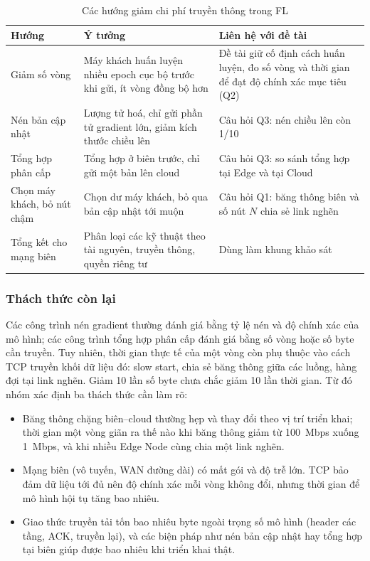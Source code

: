 \begin{table}[H]
    \centering
    \caption{Các hướng giảm chi phí truyền thông trong FL}
    \label{tab:survey}
    \begin{tabularx}{\textwidth}{>{\raggedright\arraybackslash\hsize=0.7\hsize}X >{\raggedright\arraybackslash\hsize=1.3\hsize}X >{\raggedright\arraybackslash\hsize=1.0\hsize}X}
        \toprule
        \textbf{Hướng} & \textbf{Ý tưởng} & \textbf{Liên hệ với đề tài} \\
        \midrule
        Giảm số vòng \cite{mcmahan2017fedavg} & Máy khách huấn luyện nhiều epoch cục bộ trước khi gửi, ít vòng đồng bộ hơn & Đề tài giữ cố định cách huấn luyện, đo số vòng và thời gian để đạt độ chính xác mục tiêu (Q2) \\
        \midrule
        Nén bản cập nhật \cite{konecny2016communication, lin2018dgc} & Lượng tử hoá, chỉ gửi phần tử gradient lớn, giảm kích thước chiều lên & Câu hỏi Q3: nén chiều lên còn 1/10 \\
        \midrule
        Tổng hợp phân cấp \cite{liu2020hierfavg} & Tổng hợp ở biên trước, chỉ gửi một bản lên cloud & Câu hỏi Q3: so sánh tổng hợp tại Edge và tại Cloud \\
        \midrule
        Chọn máy khách, bỏ nút chậm \cite{bonawitz2019towards} & Chọn dư máy khách, bỏ qua bản cập nhật tới muộn & Câu hỏi Q1: băng thông biên và số nút $N$ chia sẻ link nghẽn \\
        \midrule
        Tổng kết cho mạng biên \cite{lim2020survey} & Phân loại các kỹ thuật theo tài nguyên, truyền thông, quyền riêng tư & Dùng làm khung khảo sát \\
        \bottomrule
    \end{tabularx}
\end{table}

\subsubsection{Thách thức còn lại}
Các công trình nén gradient thường đánh giá bằng tỷ lệ nén và độ chính xác của mô hình; các công trình tổng hợp phân cấp đánh giá bằng số vòng hoặc số byte cần truyền. Tuy nhiên, thời gian thực tế của một vòng còn phụ thuộc vào cách TCP truyền khối dữ liệu đó: slow start, chia sẻ băng thông giữa các luồng, hàng đợi tại link nghẽn. Giảm 10 lần số byte chưa chắc giảm 10 lần thời gian. Từ đó nhóm xác định ba thách thức cần làm rõ:
\begin{itemize}
    \item Băng thông chặng biên--cloud thường hẹp và thay đổi theo vị trí triển khai; thời gian một vòng giãn ra thế nào khi băng thông giảm từ 100~Mbps xuống 1~Mbps, và khi nhiều Edge Node cùng chia một link nghẽn.
    \item Mạng biên (vô tuyến, WAN đường dài) có mất gói và độ trễ lớn. TCP bảo đảm dữ liệu tới đủ nên độ chính xác mỗi vòng không đổi, nhưng thời gian để mô hình hội tụ tăng bao nhiêu.
    \item Giao thức truyền tải tốn bao nhiêu byte ngoài trọng số mô hình (header các tầng, ACK, truyền lại), và các biện pháp như nén bản cập nhật hay tổng hợp tại biên giúp được bao nhiêu khi triển khai thật.
\end{itemize}

